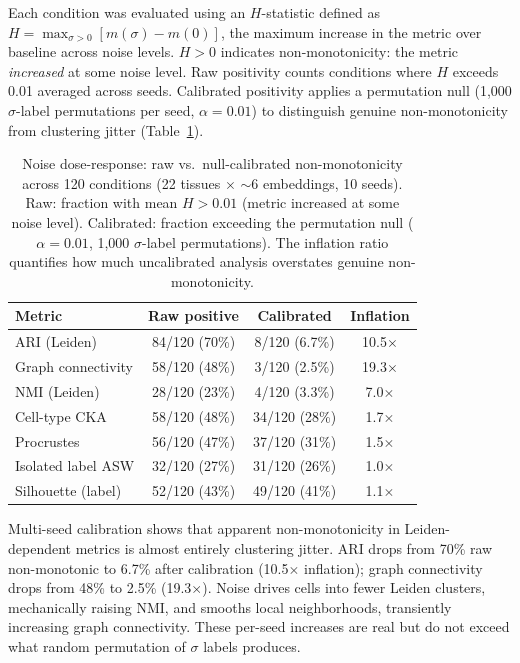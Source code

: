 \documentclass[11pt]{article}
\begin{document}
Each condition was evaluated using an $H$-statistic defined as
$H = \max_{\sigma > 0}[m(\sigma) - m(0)]$, the maximum increase in
the metric over baseline across noise levels. $H > 0$ indicates non-monotonicity:
the metric \emph{increased} at some noise level. Raw positivity
counts conditions where $H$ exceeds 0.01 averaged across seeds.
Calibrated positivity applies a permutation null (1{,}000
$\sigma$-label permutations per seed, $\alpha = 0.01$) to
distinguish genuine non-monotonicity from clustering jitter
(Table~\ref{tab:noise}).

\begin{table}[t]
\centering
\caption{Noise dose-response: raw vs.\ null-calibrated
non-monotonicity across 120 conditions (22 tissues $\times$ $\sim$6
embeddings, 10 seeds). Raw: fraction with mean $H > 0.01$ (metric
increased at some noise level). Calibrated: fraction exceeding the
permutation null ($\alpha = 0.01$, 1{,}000 $\sigma$-label
permutations). The inflation ratio quantifies how much uncalibrated
analysis overstates genuine non-monotonicity.}
\label{tab:noise}
\small
\begin{tabular}{@{}lccc@{}}
\toprule
Metric & Raw positive & Calibrated & Inflation \\
\midrule
ARI (Leiden)         & 84/120 (70\%) &  8/120 (6.7\%)  & 10.5$\times$ \\
Graph connectivity   & 58/120 (48\%) &  3/120 (2.5\%)  & 19.3$\times$ \\
NMI (Leiden)         & 28/120 (23\%) &  4/120 (3.3\%)  &  7.0$\times$ \\
\midrule
Cell-type CKA        & 58/120 (48\%) & 34/120 (28\%)   &  1.7$\times$ \\
Procrustes           & 56/120 (47\%) & 37/120 (31\%)   &  1.5$\times$ \\
\midrule
Isolated label ASW   & 32/120 (27\%) & 31/120 (26\%)   &  1.0$\times$ \\
Silhouette (label)   & 52/120 (43\%) & 49/120 (41\%)   &  1.1$\times$ \\
\bottomrule
\end{tabular}
\end{table}

Multi-seed calibration shows that apparent non-monotonicity in
Leiden-dependent metrics is almost entirely clustering jitter. ARI
drops from 70\% raw non-monotonic to 6.7\% after calibration
(10.5$\times$ inflation); graph connectivity drops from 48\% to 2.5\%
(19.3$\times$). Noise drives cells into fewer Leiden clusters,
mechanically raising NMI, and smooths local neighborhoods, transiently
increasing graph connectivity. These per-seed increases are real but
do not exceed what random permutation of $\sigma$ labels produces.
\end{document}
